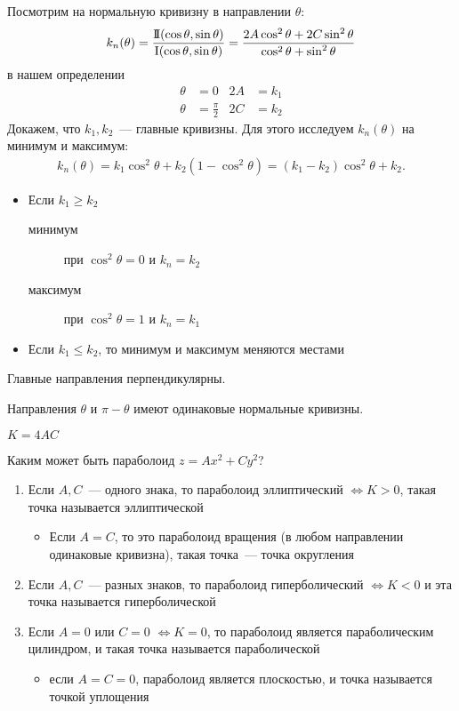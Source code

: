 \documentclass[main]{subfiles}
\begin{document}
Посмотрим на нормальную кривизну в направлении $\theta$:
\[k_{n} (\theta) = \frac{\mathrm{I\!I}(\cos \theta, \sin \theta)}{\mathrm{I}(\cos \theta, \sin \theta)} = \frac{2A \cos^2 \theta + 2C \sin^2 \theta}{\cos^2\theta + \sin^2 \theta}\]
в нашем определении
\begin{align*}
    \theta & = 0             & 2A & = k_1 \\
    \theta & = \frac{\pi}{2} & 2C & = k_2
\end{align*}
Докажем, что $k_1, k_2$~--- главные кривизны.
Для этого исследуем $k_{n}(\theta)$ на минимум и максимум:
\begin{gather*}
    k_{n}(\theta) = k_1 \cos^2 \theta + k_2(1- \cos^2 \theta) = (k_1 - k_2) \cos^2 \theta + k_2.
\end{gather*}
\begin{itemize}
    \item Если $k_1 \ge k_2$
          \begin{description}
              \item[минимум] при $\cos^2\theta = 0$ и $k_{n} = k_2$
              \item[максимум] при $\cos^2\theta = 1$ и $k_{n} = k_1$
          \end{description}
    \item Если $k_1 \le k_2$, то минимум и максимум меняются местами
\end{itemize}
\begin{corollary}
    Главные направления перпендикулярны.
\end{corollary}
\begin{corollary}
    Направления $\theta$ и $\pi - \theta$ имеют одинаковые нормальные кривизны.
\end{corollary}

\begin{remark}
    $K = 4AC$
\end{remark}
Каким может быть параболоид $z = Ax^2 + Cy^2$?


\begin{enumerate}
    \item Если $A, C$~--- одного знака, то параболоид эллиптический $\Leftrightarrow K > 0$, такая точка называется эллиптической
          \begin{itemize}
              \item Если $A=C$, то это параболоид вращения (в любом направлении одинаковые кривизна), такая точка~--- точка округления
          \end{itemize}
    \item Если $A,C$~--- разных знаков, то параболоид гиперболический $\Leftrightarrow K < 0$ и эта точка называется гиперболической
    \item Если $A =0$ или $C=0$ $\Leftrightarrow K = 0$, то параболоид является параболическим цилиндром, и такая точка называется параболической
          \begin{itemize}
              \item если $A = C = 0$, параболоид является плоскостью, и точка называется точкой уплощения
          \end{itemize}
\end{enumerate}
\end{document}
